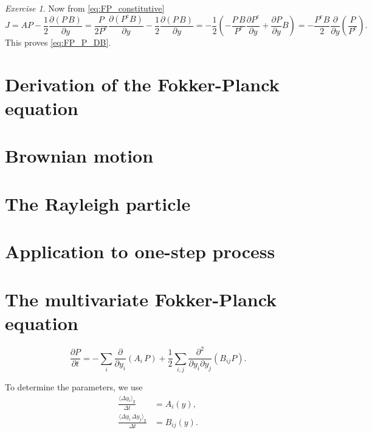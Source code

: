 \documentclass{book}
\numberwithin{equation}{section}
\theoremstyle{plain}
\theoremstyle{definition}
\theoremstyle{remark}
\theoremstyle{BoldStyle}
\newtheorem{exercise}{Exercise}
\numberwithin{exercise}{section}
\begin{document}
\begin{exercise}
{    Now from \eqref{eq:FP_constitutive}
    $$
    J = A P
    - \frac{1}{2} \frac{ \partial (P \, B ) } { \partial y }
    =
    \frac{P}{2P^e} \frac{\partial (P^e B) }{\partial y}
    - \frac{1}{2} \frac{ \partial (P \, B ) } { \partial y }
    =
    -\frac{1}{2}
    \left(
     -\frac{P \, B}{P^e} \frac{\partial P^e }{\partial y}
    + \frac{ \partial P } { \partial y } B
    \right)
    =
    -\frac{P^e B}{2}
    \frac{\partial }{ \partial y }
    \left( \frac{ P } { P^e } \right).
    $$
    This proves \eqref{eq:FP_P_DB}.
  }
\end{exercise}

\section{Derivation of the Fokker-Planck equation}

\section{Brownian motion}

\section{The Rayleigh particle}

\section{Application to one-step process}

\section{The multivariate Fokker-Planck equation}

\begin{equation}
\frac{ \partial P } { \partial t }
=
-\sum_i \frac{ \partial } { \partial y_i } (A_i \, P)
+ \frac 1 2
\sum_{i, j} \frac{ \partial^2 } { \partial y_i \partial y_j } (B_{ij} P ).
\tag{6.1}
\end{equation}

To determine the parameters, we use
\begin{equation}
\begin{aligned}
\frac{ \langle \Delta y_i \rangle_y } { \Delta t }
&=
A_i(y), \\
\frac{ \langle \Delta y_i \, \Delta y_j \rangle_y } { \Delta t }
&=
B_{ij}(y).
\end{aligned}
\tag{6.3}
\end{equation}
\end{document}
